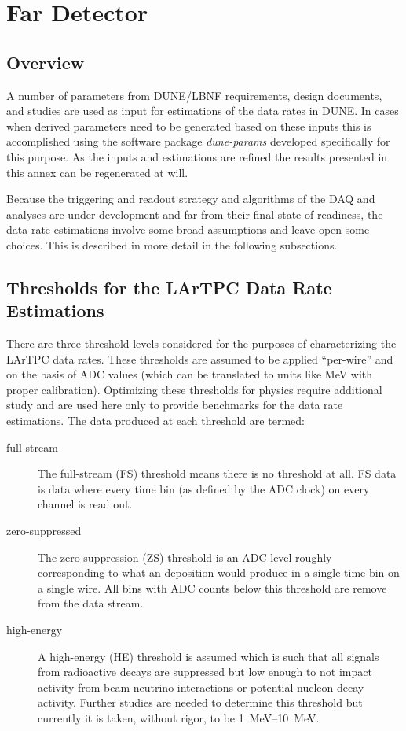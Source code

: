 \chapter{Far Detector}
\label{ch:annex-rate}

\section{Overview}

A number of parameters from DUNE/LBNF requirements, design documents,  and studies are used  as input
for estimations of the data rates in DUNE. In cases when derived parameters need to be generated based on these inputs
this is accomplished using the software package \textit{dune-params}\cite{duneparams}
developed specifically for this purpose.
As the inputs and estimations are refined the results presented in
this annex can be regenerated at will.

Because the triggering and readout strategy and algorithms of the DAQ and
analyses are under development and far from their final state of readiness,
the data rate estimations involve some broad assumptions and leave open some choices.
This is described in more detail in the following subsections.



\section{Thresholds for the LArTPC Data Rate Estimations}

There are three threshold levels considered for the purposes of characterizing the LArTPC data rates.
These thresholds are assumed to be applied ``per-wire'' and on the basis of ADC values (which can be translated
to units like MeV with proper calibration).
Optimizing these thresholds for physics require additional study and
are used here only to provide benchmarks for the data rate estimations.
The data produced at each threshold are termed:

\begin{description}
\item[full-stream] The full-stream (FS) threshold means there is no threshold at all.
FS data is data where every time bin (as defined by the ADC clock) on every channel is read out.
\item[zero-suppressed] The zero-suppression (ZS) threshold is an ADC
  level roughly corresponding to what an \chargezsthreshold deposition
  would produce in a single time bin on a single wire.
  All bins with ADC counts below this threshold are remove from the
  data stream.
\item[high-energy] A high-energy (HE) threshold is assumed which is
  such that all signals from radioactive decays are suppressed but low
  enough to not impact activity from beam neutrino interactions or
  potential nucleon decay activity.
  Further studies are needed to determine this threshold but currently
  it is taken, without rigor, to be \SI{1}{\MeV}--\SI{10}{MeV}.
\end{description}

